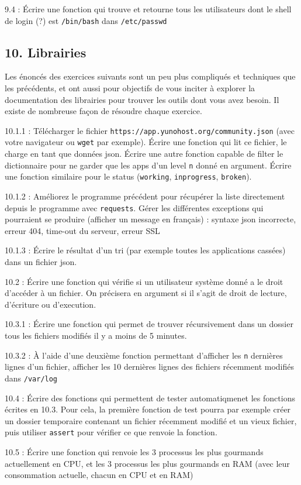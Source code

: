\documentclass[]{article}
\begin{document}
9.4 : Écrire une fonction qui trouve et retourne tous les utilisateurs
dont le shell de login (?) est \texttt{/bin/bash} dans
\texttt{/etc/passwd}

\hypertarget{librairies}{%
\subsection{10. Librairies}\label{librairies}}

Les énoncés des exercices suivants sont un peu plus compliqués et
techniques que les précédents, et ont aussi pour objectifs de vous
inciter à explorer la documentation des librairies pour trouver les
outils dont vous avez besoin. Il existe de nombreuse façon de résoudre
chaque exercice.

10.1.1 : Télécharger le fichier
\texttt{https://app.yunohost.org/community.json} (avec votre navigateur
ou \texttt{wget} par exemple). Écrire une fonction qui lit ce fichier,
le charge en tant que données json. Écrire une autre fonction capable de
filter le dictionnaire pour ne garder que les apps d'un level \texttt{n}
donné en argument. Écrire une fonction similaire pour le status
(\texttt{working}, \texttt{inprogress}, \texttt{broken}).

10.1.2 : Améliorez le programme précédent pour récupérer la liste
directement depuis le programme avec \texttt{requests}. Gérer les
différentes exceptions qui pourraient se produire (afficher un message
en français) : syntaxe json incorrecte, erreur 404, time-out du serveur,
erreur SSL

10.1.3 : Écrire le résultat d'un tri (par exemple toutes les
applications cassées) dans un fichier json.

10.2 : Écrire une fonction qui vérifie si un utilisateur système donné a
le droit d'accéder à un fichier. On précisera en argument si il s'agit
de droit de lecture, d'écriture ou d'execution.

10.3.1 : Écrire une fonction qui permet de trouver récursivement dans un
dossier tous les fichiers modifiés il y a moins de 5 minutes.

10.3.2 : À l'aide d'une deuxième fonction permettant d'afficher les
\texttt{n} dernières lignes d'un fichier, afficher les 10 dernières
lignes des fichiers récemment modifiés dans \texttt{/var/log}

10.4 : Écrire des fonctions qui permettent de tester automatiqmenet les
fonctions écrites en 10.3. Pour cela, la première fonction de test
pourra par exemple créer un dossier temporaire contenant un fichier
récemment modifié et un vieux fichier, puis utiliser \texttt{assert}
pour vérifier ce que renvoie la fonction.

10.5 : Écrire une fonction qui renvoie les 3 processus les plus
gourmands actuellement en CPU, et les 3 processus les plus gourmands en
RAM (avec leur consommation actuelle, chacun en CPU et en RAM)
\end{document}
